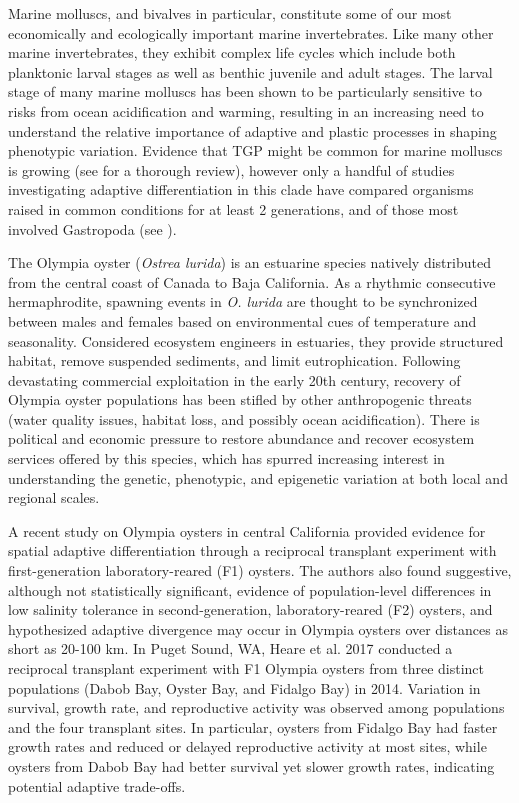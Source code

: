 \documentclass[fleqn,10pt]{wlscirep}
\begin{document}
Marine molluscs, and bivalves in particular, constitute some of our most economically and ecologically important marine invertebrates. Like many other marine invertebrates, they exhibit complex life cycles which include both planktonic larval stages as well as benthic juvenile and adult stages. The larval stage of many marine molluscs has been shown to be particularly sensitive to risks from ocean acidification and warming\cite{Parker2013-xg,Byrne2011-hk}, resulting in an increasing need to understand the relative importance of adaptive and plastic processes in shaping phenotypic variation. Evidence that TGP might be common for marine molluscs is growing (see \cite{Ross2016-en} for a thorough review), however only a handful of studies investigating adaptive differentiation in this clade have compared organisms raised in common conditions for at least 2 generations, and of those most involved Gastropoda (see \cite{Kuo2009-co,Palmer1994-nw,Sanford2010-df,Dittman1998-xm,Bible2016-rb}).\par
The Olympia oyster (\textit{Ostrea lurida}) is an estuarine species natively distributed from the central coast of Canada to Baja California. As a rhythmic consecutive hermaphrodite, spawning events in \textit{O. lurida} are thought to be synchronized between males and females based on environmental cues of temperature and seasonality\cite{Coe1932-nq}. Considered ecosystem engineers in estuaries, they provide structured habitat, remove suspended sediments, and limit eutrophication\cite{Ruesink2005-lt}. Following devastating commercial exploitation in the early 20th century, recovery of Olympia oyster populations has been stifled by other anthropogenic threats (water quality issues, habitat loss, and possibly ocean acidification)\cite{Blake2012-ln,Hettinger2013-od}. There is political and economic pressure to restore abundance and recover ecosystem services offered by this species, which has spurred increasing interest in understanding the genetic, phenotypic, and epigenetic variation at both local and regional scales\cite{Camara2009-sn}.\par
A recent study on Olympia oysters in central California provided evidence for spatial adaptive differentiation through a reciprocal transplant experiment with first-generation laboratory-reared (F1) oysters. The authors also found suggestive, although not statistically significant, evidence of population-level differences in low salinity tolerance in second-generation, laboratory-reared (F2) oysters, and hypothesized adaptive divergence may occur in Olympia oysters over distances as short as 20-100 km\cite{Bible2016-rb}. In Puget Sound, WA, Heare et al. 2017\cite{Heare2017-uv} conducted a reciprocal transplant experiment with F1 Olympia oysters from three distinct populations (Dabob Bay, Oyster Bay, and Fidalgo Bay) in 2014. Variation in survival, growth rate, and reproductive activity was observed among populations and the four transplant sites. In particular, oysters from Fidalgo Bay had faster growth rates and reduced or delayed reproductive activity at most sites, while oysters from Dabob Bay had better survival yet slower growth rates, indicating potential adaptive trade-offs\cite{Heare2017-uv}.\par
\end{document}
